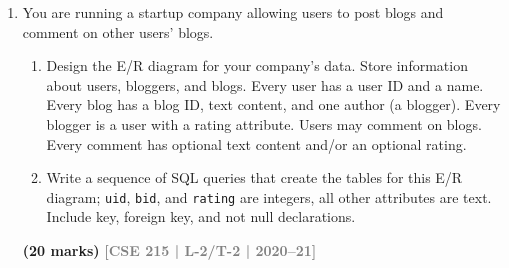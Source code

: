 \documentclass[12pt]{article}
\newcommand{\yr}[1]{\hfill\textcolor{gray}{\small\textbf{[#1]}}}
\newcommand{\mk}[1]{\textcolor{orange!70!black}{\small\textbf{(#1 marks)}}}
\begin{document}
\begin{enumerate}
\begin{center}
\end{center}


\begin{enumerate}
  \item Enroll is a strong entity set.
  \item All teachers must teach courses.
  \item All students must enroll in courses.
  \item All courses must be enrolled by students.
  \item All courses must be taught by teachers.
  \item Each course is taught by only one teacher.
  \item Each course is enrolled by only one student.
  \item Each teacher may teach many courses.
  \item Each student can enroll in many courses.
  \item Teacher is a relationship set.
\end{enumerate}
\mk{10} \yr{CSE 215 | L-2/T-2 | 2020--21}


\item You are running a startup company allowing users to post blogs and comment on other users' blogs.
\begin{enumerate}
  \item Design the E/R diagram for your company's data. Store information about users, bloggers, and blogs. Every user has a user ID and a name. Every blog has a blog ID, text content, and one author (a blogger). Every blogger is a user with a rating attribute. Users may comment on blogs. Every comment has optional text content and/or an optional rating.
  \item Write a sequence of SQL queries that create the tables for this E/R diagram; \texttt{uid}, \texttt{bid}, and \texttt{rating} are integers, all other attributes are text. Include key, foreign key, and not null declarations.
\end{enumerate}
\mk{20} \yr{CSE 215 | L-2/T-2 | 2020--21}



\end{enumerate}
\end{document}

